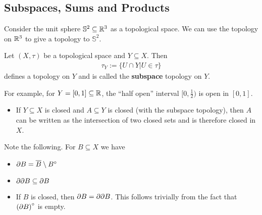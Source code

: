 \subsection{Subspaces, Sums and Products}
Consider the unit sphere $\mathbb{S}^{2} \subseteq \mathbb{R}^3$ as a topological space. 
We can use the topology on $\mathbb{R}^3$ to give a topology to $\mathbb{S}^2$.

\begin{dfn}[]
  Let $(X,\tau)$ be a topological space and $Y \subseteq X$. Then
  \begin{align*}
    \tau_Y := \{U \cap Y \big\vert U \in  \tau\}
  \end{align*}
  defines a topology on $Y$ and is called the \textbf{subspace} topology on $Y$.
\end{dfn}

For example, for $Y = [0,1] \subseteq \mathbb{R}$, the ``half open'' interval $[0, \frac{1}{2})$ is open in $[0,1]$.

\begin{itemize}
  \item If $Y \subseteq X$ is closed and $A \subseteq Y$ is closed (with the subspace topology), then $A$ can be written as the intersection of two closed sets and is therefore closed in $X$.
\end{itemize}

Note the following. For $B \subseteq X$ we have
\begin{itemize}
  \item $\partial B = \overline{B} \setminus B^{\circ}$
  \item $\partial \partial B \subseteq \partial B$
  \item If $B$ is closed, then $\partial B = \partial \partial B$. This follows trivially from the fact that $\left(\partial B\right)^{\circ}$ is empty.
\end{itemize}

